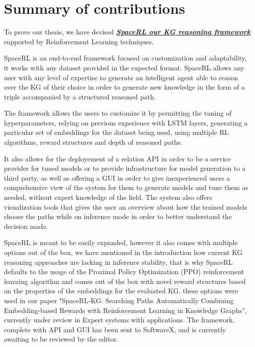 
\section{Summary of contributions}\label{sec:intro-summary}
To prove our thesis, we have devised \href{https://github.com/DEAL-US/SpaceRL-KG}{\textbf{\textit{SpaceRL our KG reasoning framework}}} supported by Reinforcement Learning techniques.

SpaceRL is an end-to-end framework focused on customization and adaptability, it works with any dataset provided in the expected format. SpaceRL allows any user with any level of expertise to generate an intelligent agent able to reason over the KG of their choice in order to generate new knowledge in the form of a triple accompanied by a structured reasoned path.

The framework allows the users to customize it by permitting the tuning of hyperparameters, relying on previous experience with LSTM layers, generating a particular set of embeddings for the dataset being used, using multiple RL algorithms, reward structures and depth of reasoned paths.

It also allows for the deployement of a relation API in order to be a service provider for tuned models or to provide infrastructure for model generation to a third party, as well as offering a GUI in order to give inexperienced users a comprehensive view of the system for them to generate models and tune them as needed, without expert knowledge of the field. The system also offers visualization tools that gives the user an overview about how the trained models choose the paths while on inference mode in order to better understand the decision made.

SpaceRL is meant to be easily expanded, however it also comes with multiple options out of the box, we have mentioned in the introduction how current KG reasoning approaches are lacking in inference stability, that is why SpaceRL defaults to the usage of the Proximal Policy Optimization (PPO) reinforcement learning algorithm and comes out of the box with novel reward structures based on the properties of the embeddings for the evaluated KG. these options were used in our paper "SpaceRL-KG: Searching Paths Automatically Combining Embedding-based Rewards with Reinforcement Learning in Knowledge Graphs", currently under review in Expert systems with applications. The framework, complete with API and GUI has been sent to SoftwareX, and is currently awaiting to be reviewed by the editor.

